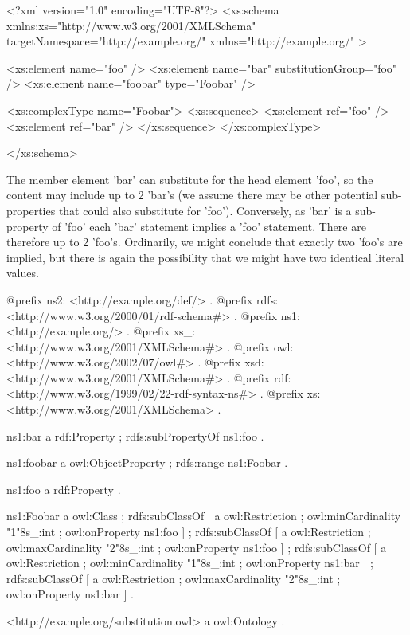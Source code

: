 \begin{DoxyCodeInclude}
<?xml version="1.0" encoding="UTF-8"?>
<xs:schema xmlns:xs="http://www.w3.org/2001/XMLSchema" 
        targetNamespace="http://example.org/" xmlns="http://example.org/" >
        
        <xs:element name="foo" />       
        <xs:element name="bar" substitutionGroup="foo" />
        <xs:element name="foobar" type="Foobar" />
        
        <xs:complexType name="Foobar">
                <xs:sequence>
                        <xs:element ref="foo" />
                        <xs:element ref="bar" />
                </xs:sequence>
        </xs:complexType>

</xs:schema>
\end{DoxyCodeInclude}


The member element 'bar' can substitute for the head element 'foo', so the content may include up to 2 'bar's (we assume there may be other potential sub-\/properties that could also substitute for 'foo'). Conversely, as 'bar' is a sub-\/property of 'foo' each 'bar' statement implies a 'foo' statement. There are therefore up to 2 'foo's. Ordinarily, we might conclude that exactly two 'foo's are implied, but there is again the possibility that we might have two identical literal values.


\begin{DoxyCodeInclude}
@prefix ns2:     <http://example.org/def/> .
@prefix rdfs:    <http://www.w3.org/2000/01/rdf-schema#> .
@prefix ns1:     <http://example.org/> .
@prefix xs_:     <http://www.w3.org/2001/XMLSchema#> .
@prefix owl:     <http://www.w3.org/2002/07/owl#> .
@prefix xsd:     <http://www.w3.org/2001/XMLSchema#> .
@prefix rdf:     <http://www.w3.org/1999/02/22-rdf-syntax-ns#> .
@prefix xs:      <http://www.w3.org/2001/XMLSchema> .

ns1:bar
      a       rdf:Property ;
      rdfs:subPropertyOf ns1:foo .

ns1:foobar
      a       owl:ObjectProperty ;
      rdfs:range ns1:Foobar .

ns1:foo
      a       rdf:Property .

ns1:Foobar
      a       owl:Class ;
      rdfs:subClassOf
              [ a       owl:Restriction ;
                owl:minCardinality "1"^^xs_:int ;
                owl:onProperty ns1:foo
              ] ;
      rdfs:subClassOf
              [ a       owl:Restriction ;
                owl:maxCardinality "2"^^xs_:int ;
                owl:onProperty ns1:foo
              ] ;
      rdfs:subClassOf
              [ a       owl:Restriction ;
                owl:minCardinality "1"^^xs_:int ;
                owl:onProperty ns1:bar
              ] ;
      rdfs:subClassOf
              [ a       owl:Restriction ;
                owl:maxCardinality "2"^^xs_:int ;
                owl:onProperty ns1:bar
              ] .

<http://example.org/substitution.owl>
      a       owl:Ontology .
\end{DoxyCodeInclude}
 